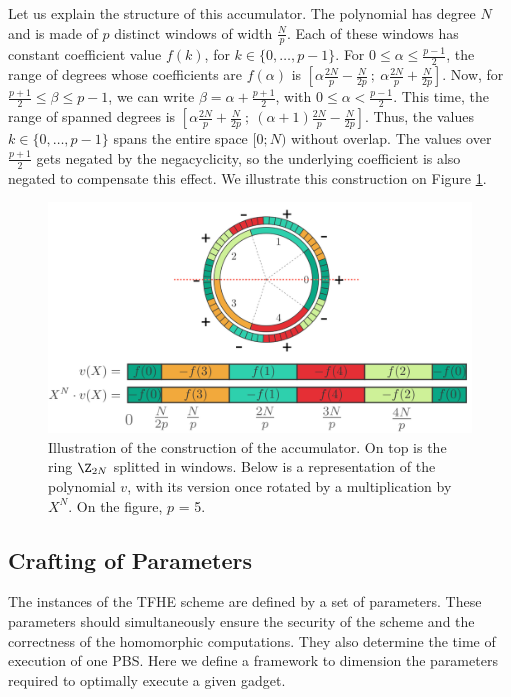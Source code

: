 Let us explain the structure of this accumulator. The polynomial has degree $N$ and is made of $p$ distinct windows of width $\frac{N}{p}$. Each of these windows has constant coefficient value $f(k)$, for $k \in \{0, \dots, p-1\}$.
For $0 \le \alpha \le \frac{p-1}{2}$, the range of degrees whose coefficients are $f(\alpha)$ is $\left [ \alpha \frac{2N}{p} - \frac{N}{2p}~;~ \alpha \frac{2N}{p} + \frac{N}{2p} \right ]$. Now, for $\frac{p+1}{2} \le \beta \le p-1$, we can write $\beta = \alpha + \frac{p+1}{2}$, with $0 \le \alpha < \frac{p-1}{2}$. This time, the range of spanned degrees is $\left [ \alpha \frac{2N}{p} + \frac{N}{2p} ~;~ (\alpha + 1) \frac{2N}{p} - \frac{N}{2p} \right ]$. Thus, the values $k \in \{0, \dots, p-1\}$ spans the entire space $[0; N)$ without overlap. The values over $\frac{p+1}{2}$ gets negated by the negacyclicity, so the underlying coefficient is also negated to compensate this effect. We illustrate this construction on Figure \ref{fig:accumulator}.

\begin{figure}
    \centering
    \includegraphics[width=\textwidth]{images/accumulator.png}
    \caption{Illustration of the construction of the accumulator. On top is the ring $\Z_{2N}$ splitted in windows. Below is a representation of the polynomial $v$, with its version once rotated by a multiplication by $X^N$. On the figure, $p$ = 5.}
    \label{fig:accumulator}
\end{figure}



\subsection{Crafting of Parameters}
\label{sec:parametrization}
The instances of the TFHE scheme are defined by a set of parameters. These parameters should simultaneously ensure the security of the scheme and the correctness of the homomorphic computations. They also determine the time of execution of one PBS. Here we define a framework to dimension the parameters required to optimally execute a given gadget.

